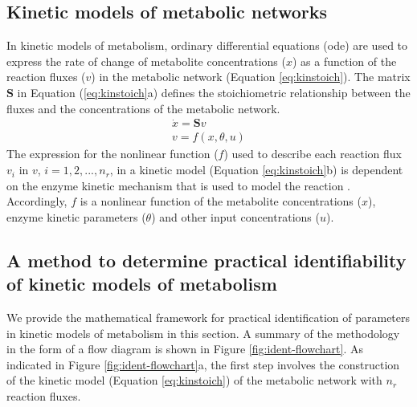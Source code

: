 \documentclass[10pt]{article}
\begin{document}
	\subsection{Kinetic models of metabolic networks}\label{sec:kinetic_model}
	In kinetic models of metabolism, ordinary differential equations (ode) are used to express the rate of change of metabolite concentrations ($x$) as a function of the reaction fluxes ($v$) in the metabolic network (Equation \ref{eq:kinstoich}). The matrix $\mathbf{S}$ in Equation (\ref{eq:kinstoich}a) defines the stoichiometric relationship between the fluxes and the concentrations of the metabolic network.
	\begin{subequations}\label{eq:kinstoich}
		\begin{align}
		\dot{x} = \mathbf{S}v\\
		v = f(x, \theta, u)
		\end{align}
	\end{subequations}
	The expression for the nonlinear function ($f$) used to describe each reaction flux $v_i$ in $v$, $i={1, 2, ..., n_r}$, in a kinetic model (Equation \ref{eq:kinstoich}b) is dependent on the enzyme kinetic mechanism that is used to model the reaction \parencite{Link2014, Srinivasan2015}. Accordingly, $f$ is a nonlinear function of the metabolite concentrations ($x$), enzyme kinetic parameters ($\theta$) and other input concentrations ($u$). 
	
	\subsection{A method to determine practical identifiability of kinetic models of metabolism}\label{sec:ident}
	We provide the mathematical framework for practical identification of parameters in kinetic models of metabolism in this section. A summary of the methodology in the form of a flow diagram is shown in Figure \ref{fig:ident-flowchart}. As indicated in Figure \ref{fig:ident-flowchart}a, the first step involves the construction of the kinetic model (Equation \ref{eq:kinstoich}) of the metabolic network with $n_r$ reaction fluxes.
	
	
\end{document}
